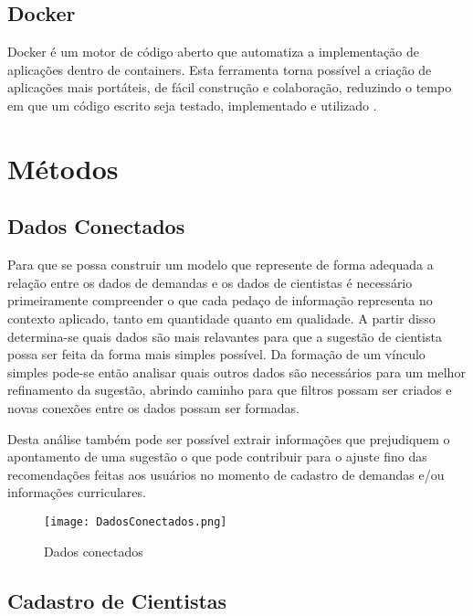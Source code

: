 \subsection{Docker}\label{subsec:docker}

Docker é um motor de código aberto que automatiza a implementação de aplicações dentro de containers. Esta ferramenta torna possível a criação de aplicações mais portáteis, de fácil construção e colaboração, reduzindo o tempo em que um código escrito seja testado, implementado e utilizado \cite{TheDockerBook}.

\section{Métodos}\label{sec:metodo}

\subsection{Dados Conectados}\label{subsec:linkedData}

Para que se possa construir um modelo que represente de forma adequada a relação entre os dados de demandas e os dados de cientistas é necessário primeiramente compreender o que cada pedaço de informação representa no contexto aplicado, tanto em quantidade quanto em qualidade. A partir disso determina-se quais dados são mais relavantes para que a sugestão de cientista possa ser feita da forma mais simples possível. Da formação de um vínculo simples pode-se então analisar quais outros dados são necessários para um melhor refinamento da sugestão, abrindo caminho para que filtros possam ser criados e novas conexões entre os dados possam ser formadas.

Desta análise também pode ser possível extrair informações que prejudiquem o apontamento de uma sugestão o que pode contribuir para o ajuste fino das recomendações feitas aos usuários no momento de cadastro de demandas e/ou informações curriculares.

\begin{figure}[htb]
    \caption{Dados conectados}
    \texttt{[image: DadosConectados.png]}
    \label{fig:dadosconectados}
\end{figure}

\subsection{Cadastro de Cientistas}\label{subsec:cadastro}

